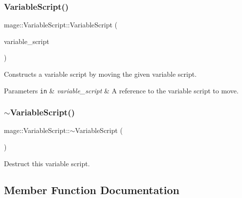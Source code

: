 \subsubsection{\texorpdfstring{Variable\+Script()}{VariableScript()}\hspace{0.1cm}{\footnotesize\ttfamily [3/3]}}
{\footnotesize\ttfamily mage\+::\+Variable\+Script\+::\+Variable\+Script (\begin{DoxyParamCaption}\item[{\hyperlink{classmage_1_1_variable_script}{Variable\+Script} \&\&}]{variable\+\_\+script }\end{DoxyParamCaption})\hspace{0.3cm}{\ttfamily [default]}}

Constructs a variable script by moving the given variable script.


\begin{DoxyParams}[1]{Parameters}
\mbox{\tt in}  & {\em variable\+\_\+script} & A reference to the variable script to move. \\
\hline
\end{DoxyParams}
\hypertarget{classmage_1_1_variable_script_ae7026e1283b1a1164f02fdc3e1f2b829}{}\label{classmage_1_1_variable_script_ae7026e1283b1a1164f02fdc3e1f2b829} 
\subsubsection{\texorpdfstring{$\sim$\+Variable\+Script()}{~VariableScript()}}
{\footnotesize\ttfamily mage\+::\+Variable\+Script\+::$\sim$\+Variable\+Script (\begin{DoxyParamCaption}{ }\end{DoxyParamCaption})\hspace{0.3cm}{\ttfamily [virtual]}}

Destruct this variable script. 

\subsection{Member Function Documentation}
\hypertarget{classmage_1_1_variable_script_a981ec417c40c5b010fc2199a7aa44f95}{}\label{classmage_1_1_variable_script_a981ec417c40c5b010fc2199a7aa44f95} 
